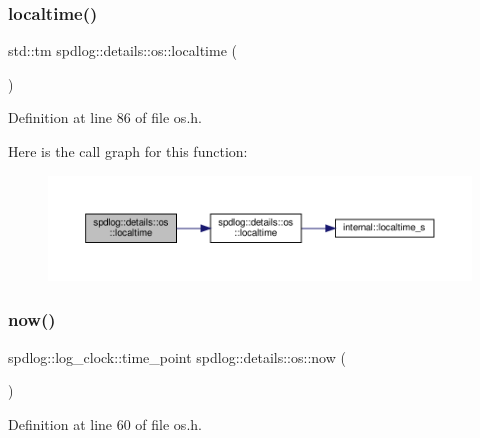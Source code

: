 \subsubsection{\texorpdfstring{localtime()}{localtime()}\hspace{0.1cm}{\footnotesize\ttfamily [2/2]}}
{\footnotesize\ttfamily std\+::tm spdlog\+::details\+::os\+::localtime (\begin{DoxyParamCaption}{ }\end{DoxyParamCaption})\hspace{0.3cm}{\ttfamily [inline]}}



Definition at line 86 of file os.\+h.

Here is the call graph for this function\+:
\nopagebreak
\begin{figure}[H]
\begin{center}
\leavevmode
\includegraphics[width=350pt]{namespacespdlog_1_1details_1_1os_a3c7704d0c74aed204f258ac1fc7d4576_cgraph}
\end{center}
\end{figure}
\mbox{\label{namespacespdlog_1_1details_1_1os_ab86a7d9f1495a0edae71ce647bae6a66}} 
\subsubsection{\texorpdfstring{now()}{now()}}
{\footnotesize\ttfamily spdlog\+::log\+\_\+clock\+::time\+\_\+point spdlog\+::details\+::os\+::now (\begin{DoxyParamCaption}{ }\end{DoxyParamCaption})\hspace{0.3cm}{\ttfamily [inline]}}



Definition at line 60 of file os.\+h.

